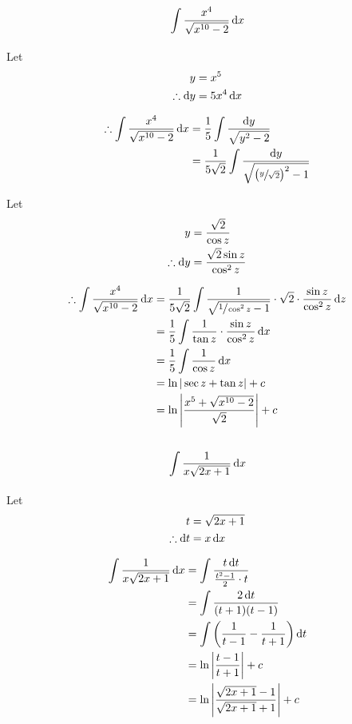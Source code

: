 \documentclass[fleqn, a4paper]{article}
\begin{document}
\subsection{\[\int \dfrac{x^4}{\sqrt{x^{10} - 2}} \dif x\]}

Let
\begin{align*}
	y &= x^5\\
	\therefore \dif y &= 5 x^4 \dif x
\end{align*}

\begin{align*}
	\therefore \int \dfrac{x^4}{\sqrt{x^{10} - 2}} \dif x &= \dfrac{1}{5} \int \dfrac{\dif y}{\sqrt{y^2 - 2}}\\
	&= \dfrac{1}{5 \sqrt{2}} \int \dfrac{\dif y}{\sqrt{\left( \sfrac{y}{\sqrt{2}} \right)^2 - 1}}
\end{align*}

Let
\begin{align*}
	y &= \dfrac{\sqrt{2}}{\cos z}\\
	\therefore \dif y &= \dfrac{\sqrt{2} \sin z}{\cos^2 z}
\end{align*}

\begin{align*}
	\therefore \int \dfrac{x^4}{\sqrt{x^{10} - 2}} \dif x &= \dfrac{1}{5 \sqrt{2}} \int \dfrac{1}{\sqrt{\sfrac{1}{\cos^2 z} - 1}} \cdot \sqrt{2} \cdot \dfrac{\sin z}{\cos^2 z} \dif z\\
	&= \dfrac{1}{5} \int \dfrac{1}{\tan z} \cdot \dfrac{\sin z}{\cos^2 z} \dif x\\
	&= \dfrac{1}{5} \int \dfrac{1}{\cos z} \dif x\\
	&= \ln |\sec z + \tan z| + c\\
	&= \ln \left\lvert \dfrac{x^5 + \sqrt{x^{10} - 2}}{\sqrt{2}} \right\rvert + c
\end{align*}

\subsection{\[\int \dfrac{1}{x \sqrt{2x + 1}} \dif x\]}

Let
\begin{align*}
	t &= \sqrt{2x + 1}\\
	\therefore \dif t &= x \dif x
\end{align*}

\begin{align*}
	\int \dfrac{1}{x \sqrt{2x + 1}} \dif x &= \int \dfrac{t \dif t}{\frac{t^2 - 1}{2} \cdot t}\\
	&= \int \dfrac{2 \dif t}{(t + 1)(t - 1)}\\
	&= \int \left( \dfrac{1}{t - 1} - \dfrac{1}{t + 1} \right) \dif t\\
	&= \ln \left\lvert \dfrac{t - 1}{t + 1} \right\rvert + c\\
	&= \ln \left\lvert \dfrac{\sqrt{2x + 1} - 1}{\sqrt{2x + 1} + 1} \right\rvert + c
\end{align*}
\end{document}
